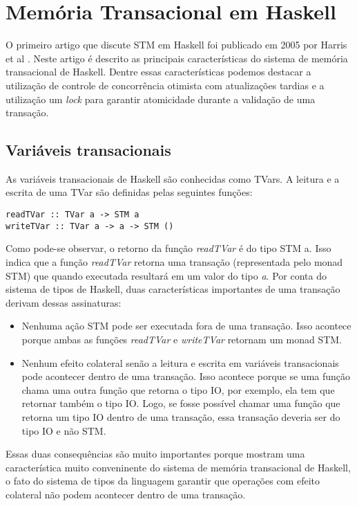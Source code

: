 \section{Memória Transacional em Haskell}

O primeiro artigo que discute STM em Haskell foi publicado em 2005 por Harris et al \cite{harris2005composable}. Neste artigo é descrito as principais características do sistema de memória transacional de Haskell. Dentre essas características podemos destacar a utilização de controle de concorrência otimista com atualizações tardias e a utilização um \emph{lock} para garantir atomicidade durante a validação de uma transação.

\subsection{Variáveis transacionais}

As variáveis transacionais de Haskell são conhecidas como TVars. A leitura e a escrita de uma TVar são definidas pelas seguintes funções:
\begin{verbatim}
readTVar :: TVar a -> STM a
writeTVar :: TVar a -> a -> STM ()
\end{verbatim}

Como pode-se observar, o retorno da função \emph{readTVar} é do tipo STM a. Isso indica que a função \emph{readTVar} retorna uma transação (representada pelo monad STM) que quando executada resultará em um valor do tipo \emph{a}. Por conta do sistema de tipos de Haskell, duas características importantes de uma transação derivam dessas assinaturas:
\begin{itemize}
  \item Nenhuma ação STM pode ser executada fora de uma transação. Isso acontece porque ambas as funções \emph{readTVar} e \emph{writeTVar} retornam um monad STM.
  \item Nenhum efeito colateral senão a leitura e escrita em variáveis transacionais pode acontecer dentro de uma transação. Isso acontece porque se uma função chama uma outra função que retorna o tipo IO, por exemplo, ela tem que retornar também o tipo IO. Logo, se fosse possível chamar uma função que retorna um tipo IO dentro de uma transação, essa transação deveria ser do tipo IO e não STM.
\end{itemize}

Essas duas consequências são muito importantes porque mostram uma característica muito conveninente do sistema de memória transacional de Haskell, o fato do sistema de tipos da linguagem garantir que operações com efeito colateral não podem acontecer dentro de uma transação.

